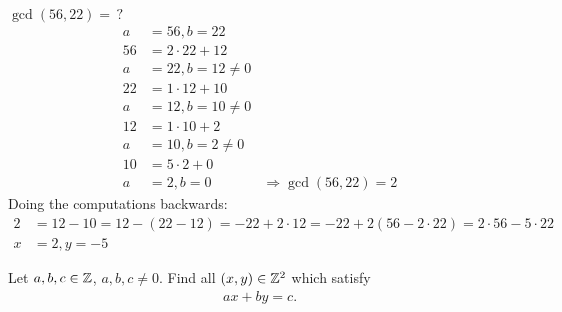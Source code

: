 \documentclass[NumTh.tex]{subfiles}
\begin{document}
\begin{ex}
  $\gcd(56,22) = \,?$
  \begin{align*}
    a &= 56, b = 22\\
    56 &= 2 \cdot 22 + 12\\
    a &= 22, b = 12 \neq 0\\
    22 &= 1 \cdot 12 + 10\\
    a &= 12, b = 10 \neq 0\\
    12 &= 1 \cdot 10 + 2\\
    a &= 10, b = 2 \neq 0\\
    10 &= 5 \cdot 2 + 0\\
    a &= 2, b = 0 & \Rightarrow \gcd(56,22) = 2
  \end{align*}
  Doing the computations backwards:
  \begin{align*}
    2 &= 12 -10 = 12 - (22 - 12) = -22 + 2 \cdot 12 = -22 + 2(56-2 \cdot 22) = 2 \cdot 56 - 5 \cdot 22\\
    x &= 2, y = -5
  \end{align*}
\end{ex}

\begin{app*}
Let $a,b,c \in \mathbb{Z}$, $a,b,c \neq 0$. Find all $(x,y) \in \mathbb{Z}^2$ which satisfy
\begin{align}
  \label{eq:lde}
  ax+by = c.
\end{align}
\end{app*}
\end{document}
